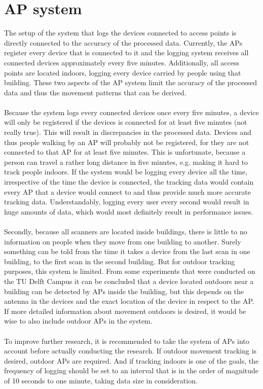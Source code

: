 \section{AP system}
The setup of the system that logs the devices connected to access points is directly connected to the accuracy of the processed data. Currently, the APs register every device that is connected to it and the logging system receives all connected devices approximately every five minutes. Additionally, all access points are located indoors, logging every device carried by people using that building. These two aspects of the AP system limit the accuracy of the processed data and thus the movement patterns that can be derived. \\\\
Because the system logs every connected devices once every five minutes, a device will only be registered if the devices is connected for at least five minutes (not really true). This will result in discrepancies in the processed data. Devices and thus people walking by an AP will probably not be registered, for they are not connected to that AP for at least five minutes. This is unfortunate, because a person can travel a rather long distance in five minutes, e.g. making it hard to track people indoors. If the system would be logging every device all the time, irrespective of the time the device is connected, the tracking data would contain every AP that a device would connect to and thus provide much more accurate tracking data. Understandably, logging every user every second would result in huge amounts of data, which would most definitely result in performance issues.\\\\
Secondly, because all scanners are located inside buildings, there is little to no information on people when they move from one building to another. Surely something can be told from the time it takes a device from the last scan in one building, to the first scan in the second building. But for outdoor tracking purposes, this system is limited. From some experiments that were conducted on the TU Delft Campus it can be concluded that a device located outdoors near a building can be detected by APs inside the building, but this depends on the antenna in the devices and the exact location of the device in respect to the AP. If more detailed information about movement outdoors is desired, it would be wise to also include outdoor APs in the system.\\\\
To improve further research, it is recommended to take the system of APs into account before actually conducting the research. If outdoor movement tracking is desired, outdoor APs are required. And if tracking indoors is one of the goals, the frequency of logging should be set to an interval that is in the order of magnitude of 10 seconds to one minute, taking data size in consideration.

